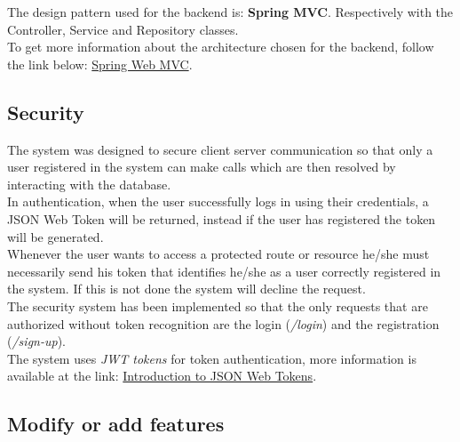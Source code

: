 The design pattern used for the backend is: \textbf{Spring MVC}.
Respectively with the Controller, Service and Repository classes.
\\ 
To get more information about the architecture chosen for the backend, follow the link below: \href{https://docs.spring.io/spring/docs/current/spring-framework-reference/web.html}{Spring Web MVC}.


\subsection{Security}
The system was designed to secure client server communication so that only a user registered in the system can make calls which are then resolved by interacting with the database.\\
In authentication, when the user successfully logs in using their credentials, a JSON Web Token will be returned, instead if the user has registered the token will be generated.\\
Whenever the user wants to access a protected route or resource he/she must necessarily send his token that identifies he/she as a user correctly registered in the system. If this is not done the system will decline the request.\\
The security system has been implemented so that the only requests that are authorized without token recognition are the login (\textit{/login}) and the registration (\textit{/sign-up}).\\
The system uses \textit{JWT tokens} for token authentication, more information is available at the link: \href{https://jwt.io/introduction/}{Introduction to JSON Web Tokens}.

\subsection{Modify or add features}
